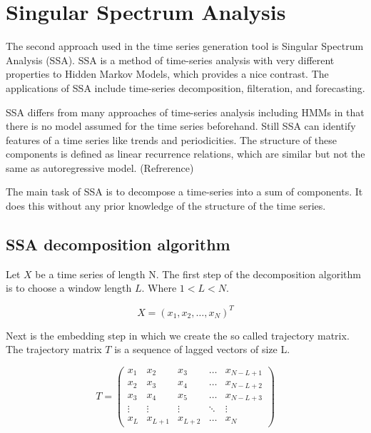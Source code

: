 
\chapter{Singular Spectrum Analysis}\label{chapter:ssa}

The second approach used in the time series generation tool is Singular Spectrum Analysis (SSA). SSA is a method of time-series analysis with very different properties to Hidden Markov Models, which provides a nice contrast. The applications of SSA include time-series decomposition, filteration, and forecasting. 

SSA differs from many approaches of time-series analysis including HMMs in that there is no model assumed for the time series beforehand. Still SSA can identify features of a time series like trends and periodicities. The structure of these components is defined as linear recurrence relations, which are similar but not the same as autoregressive model. (Refrerence)

The main task of SSA is to decompose a time-series into a sum of components. It does this without any prior knowledge of the structure of the time series. 

\section{SSA decomposition algorithm}

Let $X$ be a time series of length N. The first step of the decomposition algorithm is to choose a window length $L$. Where $1 < L < N$. 

\begin{equation}
   X = (x_1, x_2, \ldots ,x_N)^T
\end{equation}

Next is the embedding step in which we create the so called trajectory matrix. The trajectory matrix $T$ is a sequence of lagged vectors of size L. 

\begin{equation}
   T = 
\left(\begin{array}{ccccc}
x_{1} & x_{2} & x_{3} & \dots & x_{N-L+1} \\
x_{2} & x_{3} & x_{4} & \dots & x_{N-L+2} \\
x_{3} & x_{4} & x_{5} & \dots & x_{N-L+3} \\
\vdots & \vdots & \vdots & \ddots & \vdots \\
x_{L} & x_{L+1} & x_{L+2} & \dots & x_{N}
\end{array}\right)
   \label{eq:ssa-trajectory}
\end{equation}

